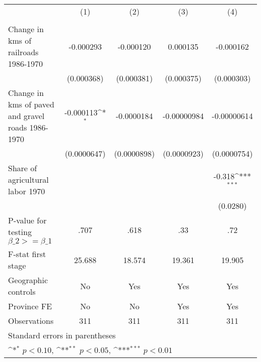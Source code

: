 {
\def\sym#1{\ifmmode^{#1}\else\(^{#1}\)\fi}
\begin{tabular}{l*{4}{c}}
\hline\hline
                &\multicolumn{1}{c}{(1)}&\multicolumn{1}{c}{(2)}&\multicolumn{1}{c}{(3)}&\multicolumn{1}{c}{(4)}\\
                &\multicolumn{1}{c}{}&\multicolumn{1}{c}{}&\multicolumn{1}{c}{}&\multicolumn{1}{c}{}\\
\hline
Change in kms of railroads 1986-1970&-0.000293         &-0.000120         & 0.000135         &-0.000162         \\
                &(0.000368)         &(0.000381)         &(0.000375)         &(0.000303)         \\
[1em]
Change in kms of paved and gravel roads 1986-1970&-0.000113\sym{*}  &-0.0000184         &-0.00000984         &-0.00000614         \\
                &(0.0000647)         &(0.0000898)         &(0.0000923)         &(0.0000754)         \\
[1em]
Share of agricultural labor 1970&                  &                  &                  &   -0.318\sym{***}\\
                &                  &                  &                  & (0.0280)         \\
\hline
P-value for testing $\beta\_{2} >= \beta\_{1}$&     .707         &     .618         &      .33         &      .72         \\
F-stat first stage&   25.688         &   18.574         &   19.361         &   19.905         \\
Geographic controls&       No         &      Yes         &      Yes         &      Yes         \\
Province FE     &       No         &       No         &      Yes         &      Yes         \\
Observations    &      311         &      311         &      311         &      311         \\
\hline\hline
\multicolumn{5}{l}{\footnotesize Standard errors in parentheses}\\
\multicolumn{5}{l}{\footnotesize \sym{*} \(p<0.10\), \sym{**} \(p<0.05\), \sym{***} \(p<0.01\)}\\
\end{tabular}
}
